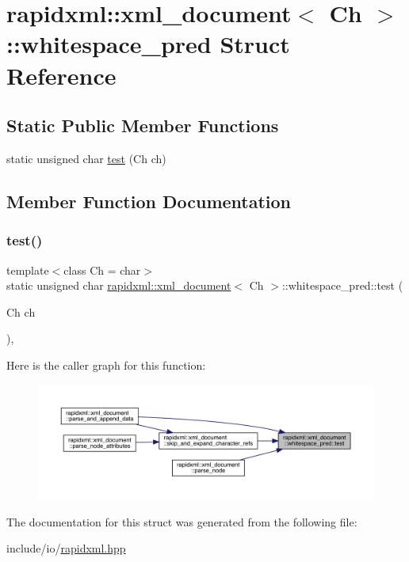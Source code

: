 \hypertarget{structrapidxml_1_1xml__document_1_1whitespace__pred}{}\section{rapidxml\+::xml\+\_\+document$<$ Ch $>$\+::whitespace\+\_\+pred Struct Reference}
\label{structrapidxml_1_1xml__document_1_1whitespace__pred}
\subsection*{Static Public Member Functions}
\begin{DoxyCompactItemize}
\item 
static unsigned char \mbox{\hyperlink{structrapidxml_1_1xml__document_1_1whitespace__pred_a1dca1a175c784b2ef0b83f3957e820eb}{test}} (Ch ch)
\end{DoxyCompactItemize}


\subsection{Member Function Documentation}
\mbox{\label{structrapidxml_1_1xml__document_1_1whitespace__pred_a1dca1a175c784b2ef0b83f3957e820eb}} 
\subsubsection{\texorpdfstring{test()}{test()}}
{\footnotesize\ttfamily template$<$class Ch = char$>$ \\
static unsigned char \mbox{\hyperlink{classrapidxml_1_1xml__document}{rapidxml\+::xml\+\_\+document}}$<$ Ch $>$\+::whitespace\+\_\+pred\+::test (\begin{DoxyParamCaption}\item[{Ch}]{ch }\end{DoxyParamCaption})\hspace{0.3cm}{\ttfamily [inline]}, {\ttfamily [static]}}

Here is the caller graph for this function\+:\nopagebreak
\begin{figure}[H]
\begin{center}
\leavevmode
\includegraphics[width=350pt]{structrapidxml_1_1xml__document_1_1whitespace__pred_a1dca1a175c784b2ef0b83f3957e820eb_icgraph}
\end{center}
\end{figure}


The documentation for this struct was generated from the following file\+:\begin{DoxyCompactItemize}
\item 
include/io/\mbox{\hyperlink{rapidxml_8hpp}{rapidxml.\+hpp}}\end{DoxyCompactItemize}
